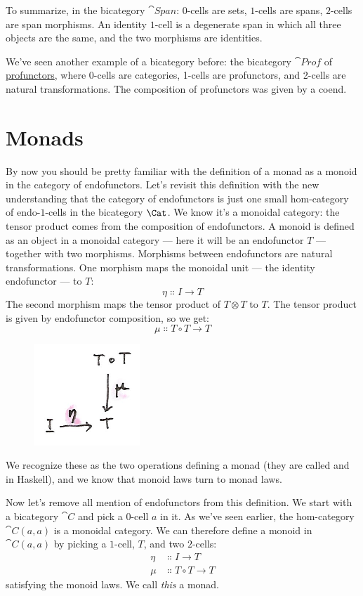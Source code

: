 \noindent
To summarize, in the bicategory $\cat{Span}$: $0$-cells are sets, $1$-cells
are spans, $2$-cells are span morphisms. An identity $1$-cell is a
degenerate span in which all three objects are the same, and the two
morphisms are identities.

We've seen another example of a bicategory before: the bicategory
$\cat{Prof}$ of
\hyperref[ends-and-coends]{profunctors},
where 0-cells are categories, 1-cells are profunctors, and 2-cells are
natural transformations. The composition of profunctors was given by a
coend.

\section{Monads}

By now you should be pretty familiar with the definition of a monad as a
monoid in the category of endofunctors. Let's revisit this definition
with the new understanding that the category of endofunctors is just one
small hom-category of endo-$1$-cells in the bicategory $\Cat$. We
know it's a monoidal category: the tensor product comes from the
composition of endofunctors. A monoid is defined as an object in a
monoidal category --- here it will be an endofunctor $T$ ---
together with two morphisms. Morphisms between endofunctors are natural
transformations. One morphism maps the monoidal unit --- the identity
endofunctor --- to $T$:
\[\eta \Colon I \to T\]
The second morphism maps the tensor product of $T \otimes T$ to
$T$. The tensor product is given by endofunctor composition, so
we get:
\[\mu \Colon T \circ T \to T\]

\begin{figure}[H]
\centering
\includegraphics[width=40mm]{images/monad.png}
\end{figure}

\noindent
We recognize these as the two operations defining a monad (they are
called  and  in Haskell), and we know that
monoid laws turn to monad laws.

Now let's remove all mention of endofunctors from this definition. We
start with a bicategory $\cat{C}$ and pick a $0$-cell $a$ in it.
As we've seen earlier, the hom-category $\cat{C}(a, a)$ is a monoidal
category. We can therefore define a monoid in $\cat{C}(a, a)$ by
picking a $1$-cell, $T$, and two $2$-cells:
\begin{align*}
\eta &\Colon I \to T \\
\mu &\Colon T \circ T \to T
\end{align*}
satisfying the monoid laws. We call \emph{this} a monad.

